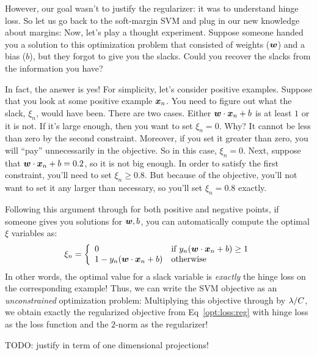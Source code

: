 However, our goal wasn't to justify the regularizer: it was to
understand hinge loss.  So let us go back to the soft-margin SVM and
plug in our new knowledge about margins:
%
%
Now, let's play a thought experiment.  Suppose someone handed you a
solution to this optimization problem that consisted of weights
(${\boldsymbol{w}}$) and a bias ($b$), but they forgot to give you the slacks.
Could you recover the slacks from the information you have?

In fact, the answer is yes!  For simplicity, let's consider positive
examples.  Suppose that you look at some positive example ${\boldsymbol{x}}_n$.
You need to figure out what the slack, $\xi_n$, would have been.
There are two cases.  Either ${\boldsymbol{w}} \cdot {\boldsymbol{x}}_n+b$ is at least $1$ or
it is not.  If it's large enough, then you want to set $\xi_n = 0$.
Why?  It cannot be less than zero by the second constraint.  Moreover,
if you set it greater than zero, you will ``pay'' unnecessarily in the
objective.  So in this case, $\xi_n=0$.  Next, suppose that
${\boldsymbol{w}} \cdot {\boldsymbol{x}}_n+b = 0.2$, so it is not big enough.  In order to
satisfy the first constraint, you'll need to set $\xi_n \geq 0.8$.
But because of the objective, you'll not want to set it any larger
than necessary, so you'll set $\xi_n = 0.8$ exactly.

Following this argument through for both positive and negative points,
if someone gives you solutions for ${\boldsymbol{w}},b$, you can automatically
compute the optimal $\xi$ variables as:
%
\begin{equation}
  \xi_n = \left\{\begin{array}{ll}
    0 & \text{if } y_n({\boldsymbol{w}} \cdot {\boldsymbol{x}}_n+b) \geq 1 \\
    1 - y_n({\boldsymbol{w}} \cdot {\boldsymbol{x}}_n+b) & \text{otherwise}\end{array}\right.
\end{equation}
%
In other words, the optimal value for a slack variable is
\emph{exactly} the hinge loss on the corresponding example!  Thus, we
can write the SVM objective as an \emph{unconstrained} optimization
problem:
%
%
Multiplying this objective through by $\lambda/C$, we obtain exactly the
regularized objective from Eq~\eqref{opt:loss:reg} with hinge loss as
the loss function and the $2$-norm as the regularizer!

TODO: justify in term of one dimensional projections!

\begin{comment}
   - Squared error for regression
   - Closed form
   - Gradient descent on error function
   - 0/1 loss and convex upper bounds for classification
   - Logistic loss, exponential loss, gradient descent
   - Hinge loss and subgradient descent
\end{comment}


